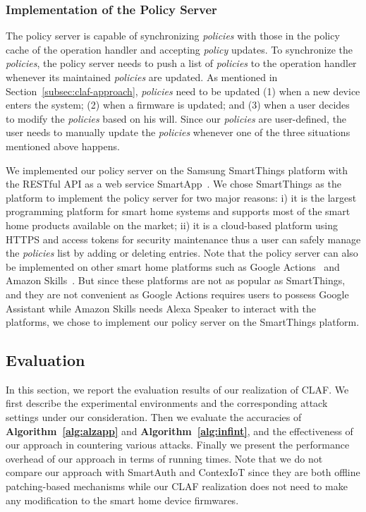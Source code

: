 \documentclass[letterpaper,12pt]{article}
\begin{document}
\subsubsection{Implementation of the Policy Server}
The policy server is capable of synchronizing \textit{policies} with those in the policy cache of the operation handler and accepting \textit{policy} updates. To synchronize the \textit{policies}, the policy server needs to push a list of \textit{policies} to the operation handler whenever its maintained \textit{policies} are updated. As mentioned in Section~\ref{subsec:claf-approach}, \textit{policies} need to be updated (1) when a new device enters the system; (2) when a firmware is updated; and (3) when a user decides to modify the \textit{policies} based on his will. Since our \textit{policies} are user-defined, the user needs to manually update the \textit{policies} whenever one of the three situations mentioned above happens. 

We implemented our policy server on the Samsung SmartThings platform with the RESTful API as a web service SmartApp~\cite{smartthings}. We chose SmartThings as the platform to implement the policy server for two major reasons: i) it is the largest programming platform for smart home systems and supports most of the smart home products available on the market; ii) it is a cloud-based platform using HTTPS and access tokens for security maintenance thus a user can safely manage the \textit{policies} list by adding or deleting entries. Note that the policy server can also be implemented on other smart home platforms such as Google Actions~\cite{googleaction} and Amazon Skills~\cite{amazonskill}. But since these platforms are not as popular as SmartThings, and they are not convenient as Google Actions requires users to possess Google Assistant while Amazon Skills needs Alexa Speaker to interact with the platforms, we chose to implement our policy server on the SmartThings platform.

\subsection{Evaluation}
\label{subsec:claf-eval}
In this section, we report the evaluation results of our realization of CLAF. We first describe the experimental environments and the corresponding attack settings under our consideration. Then we evaluate the accuracies of {\bf Algorithm~\ref{alg:alzapp}} and {\bf Algorithm~\ref{alg:infint}}, and the effectiveness of our approach in countering various attacks. Finally we present the performance overhead of our approach in terms of running times. Note that we do not compare our approach with SmartAuth and ContexIoT since they are both offline patching-based mechanisms while our CLAF realization does not need to make any modification to the smart home device firmwares.
\end{document}
